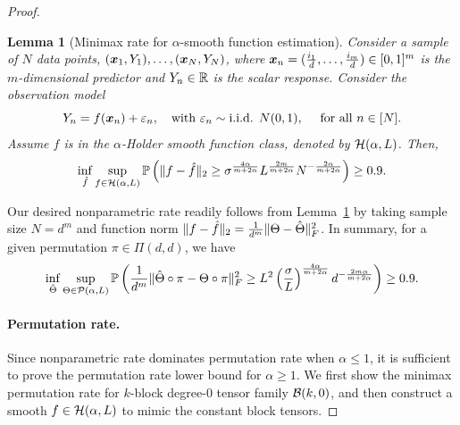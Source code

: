 \documentclass[12pt]{article}
\newtheorem{lem}{Lemma}
\theoremstyle{definition}
\begin{document}
\begin{proof}
\begin{lem}[Minimax rate for $\alpha$-smooth function estimation]\label{lem:non} Consider a sample of $N$ data points, $(\bm x_1,Y_1), \ldots, (\bm x_N,Y_N)$, where $\bm x_n=({i_1\over d},\ldots,{i_m\over d})\in[0,1]^m$ is the $m$-dimensional predictor and $Y_n\in\mathbb{R}$ is the scalar response. Consider the observation model
\[
Y_n=f(\mx_n)+\varepsilon_n,\quad \text{with}\ \varepsilon_n \sim \text{i.i.d. }  N(0,1), \quad\text{ for all }n\in[N].
\]
Assume $f$ is in the $\alpha$-Holder smooth function class, denoted by $\mathcal{H}(\alpha,L)$. Then,
\begin{equation}
\inf_{\hat f}\sup_{f\in \mathcal{H}(\alpha,L)}\mathbb{P}\left(\lVert f-\hat f\rVert_2\geq \sigma^{4\alpha\over m+2\alpha}L^{2m\over m+2\alpha} N^{-{2\alpha\over m+2\alpha}}\right)\geq 0.9.
\end{equation}
\end{lem}
Our desired nonparametric rate readily follows from Lemma~\ref{lem:non} by taking sample size $N=d^m$ and function norm $\lVert f-\hat f\rVert_2={1\over d^m}\lVert\Theta-\hat \Theta\rVert_F^2$. In summary, for a given permutation $\pi\in\Pi(d,d)$, we have
\begin{align}\label{eq:non}
\inf_{\hat \Theta}\sup_{\Theta\in \mathcal{P}(\alpha,L)}\mathbb{P}\left({1\over d^m}\lVert\hat \Theta\circ \pi-\Theta\circ \pi\rVert_F^2\geq L^2\left(\sigma\over L\right)^{4\alpha\over m+2\alpha} d^{-{2m\alpha\over m+2\alpha}}\right) \geq 0.9.
\end{align}



\paragraph{Permutation rate.}
Since nonparametric rate dominates permutation rate when $\alpha\leq 1$, it is sufficient to prove the permutation rate lower bound for $\alpha\geq 1.$
We first show the minimax permutation rate for $k$-block degree-$0$ tensor family $\mathcal{B}(k,0)$, and then construct a smooth $f\in\mathcal{H}(\alpha,L)$ to mimic the constant block tensors. 


\end{proof}
\end{document}
